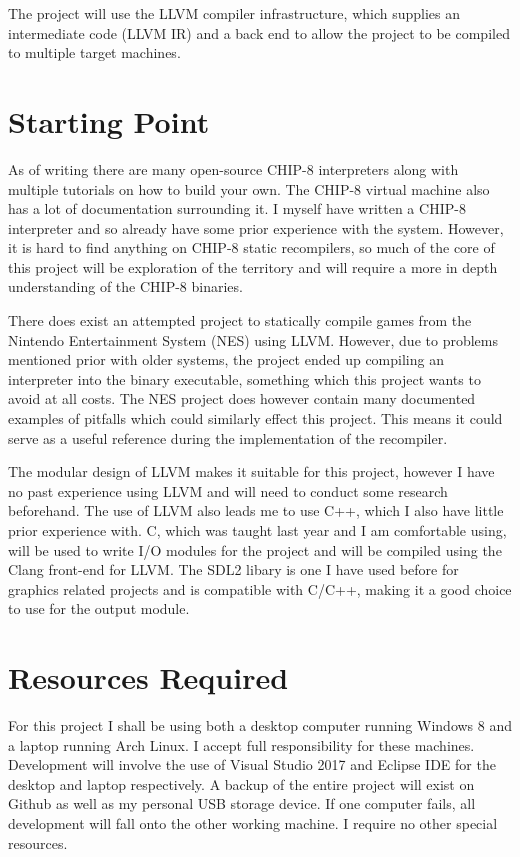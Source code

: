 \documentclass[12pt,a4paper,twoside]{article}
\begin{document}
The project will use the LLVM compiler infrastructure, which supplies an intermediate code (LLVM IR) and a back end to allow the project to be compiled to multiple target machines.

\section*{Starting Point}

As of writing there are many open-source CHIP-8 interpreters along with multiple tutorials on how to build your own. The CHIP-8 virtual machine also has a lot of documentation surrounding it. I myself have written a CHIP-8 interpreter and so already have some prior experience with the system. However, it is hard to find anything on CHIP-8 static recompilers, so much of the core of this project will be exploration of the territory and will require a more in depth understanding of the CHIP-8 binaries.

There does exist an attempted project to statically compile games from the Nintendo Entertainment System (NES) using LLVM. However, due to problems mentioned prior with older systems, the project ended up compiling an interpreter into the binary executable, something which this project wants to avoid at all costs. The NES project does however contain many documented examples of pitfalls which could similarly effect this project. This means it could serve as a useful reference during the implementation of the recompiler.

The modular design of LLVM makes it suitable for this project, however I have no past experience using LLVM and will need to conduct some research beforehand. The use of LLVM also leads me to use C++, which I also have little prior experience with. C, which was taught last year and I am comfortable using, will be used to write I/O modules for the project and will be compiled using the Clang front-end for LLVM. The SDL2 libary is one I have used before for graphics related projects and is compatible with C/C++, making it a good choice to use for the output module.


\section*{Resources Required}

For this project I shall be using both a desktop computer running Windows 8 and a laptop running Arch Linux. I accept full responsibility for these machines. Development will involve the use of Visual Studio 2017 and Eclipse IDE for the desktop and laptop respectively. A backup of the entire project will exist on Github as well as my personal USB storage device. If one computer fails, all development will fall onto the other working machine. I require no other special resources.
\end{document}
